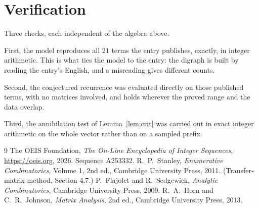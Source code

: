 \documentclass[11pt,a4paper]{article}
\theoremstyle{plain}
\theoremstyle{definition}
\begin{document}
\section{Verification}

Three checks, each independent of the algebra above.

First, the model reproduces all $21$ terms the entry publishes, exactly, in integer
arithmetic. This is what ties the model to the entry: the digraph is built by reading the
entry's English, and a misreading gives different counts.

Second, the conjectured recurrence was evaluated directly on those published terms, with no
matrices involved, and holds wherever the proved range and the data overlap.

Third, the annihilation test of Lemma~\ref{lem:crit} was carried out in exact integer
arithmetic on the whole vector rather than on a sampled prefix.

\begin{thebibliography}{9}
 The OEIS Foundation, \emph{The On-Line Encyclopedia of Integer
Sequences}, \url{https://oeis.org}, 2026. Sequence A253332.
 R.~P.~Stanley, \emph{Enumerative Combinatorics}, Volume 1, 2nd ed.,
Cambridge University Press, 2011. (Transfer-matrix method, Section 4.7.)
 P.~Flajolet and R.~Sedgewick, \emph{Analytic Combinatorics}, Cambridge
University Press, 2009.
 R.~A.~Horn and C.~R.~Johnson, \emph{Matrix Analysis}, 2nd ed., Cambridge
University Press, 2013.
\end{thebibliography}
\end{document}
